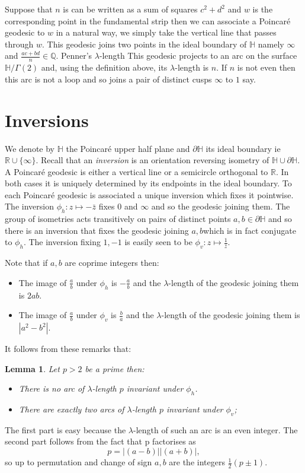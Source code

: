 \documentclass[12pt,a4paper]{amsart}
\newtheorem{lem}[thm]{Lemma}
\def\rh{\phi_h}
\def\rv{\phi_v}
\def\HH{\mathbb{H}}
\def\dHH{\partial \mathbb{H}}
\def\g2{\Gamma(2)}
\def\xx{\HH/\g2}
\begin{document}
Suppose that $n$ is can be written as a sum of squares $c^2 +d^2$
and $w$ is the corresponding point in the fundamental strip then we
can associate a Poincaré geodesic to $w$ in a natural way, 
we simply take the vertical line that passes through $w$.
This geodesic joins two points in the ideal boundary of $\mathbb{H}$
namely $\infty$ and $\frac{ac + bd}{n}\in \mathbb{Q}$.
Penner's $\lambda$-length
This geodesic projects to an arc on the surface $\xx$
and, using the definition above, its $\lambda$-length is $n$.
If $n$ is not even then this arc is not a loop
and so joins a pair of distinct cusps $\infty$ to $1$ say.



\section{Inversions}

We denote by $\mathbb{H}$ the Poincaré upper half plane and $\dHH$
its ideal boundary ie $\mathbb{R}\cup \{\infty\}$.
Recall that an \textit{inversion} is an orientation reversing
isometry of $\mathbb{H}\cup \dHH$. 
A Poincaré geodesic is either a vertical line or a semicircle
orthogonal to $\mathbb{R}$.
In both cases it is uniquely determined by its endpoints in the
ideal boundary.
To each Poincaré geodesic is associated a unique inversion which fixes it pointwise. 
The inversion
$\rh: z\mapsto -\bar{z}$ fixes $0$ and $\infty$ 
and so the geodesic joining them.
The group of isometries acts transitively on pairs of distinct
points $a,b \in \partial \mathbb{H}$ and so
there is an inversion that fixes the geodesic joining $a,b$which is
in fact conjugate to $\rh$.
The inversion fixing $1,-1$ is easily seen to be
$\rv:z\mapsto \frac{1}{\bar{z}}$. 

Note that if $a,b$ are coprime integers then:
\begin{itemize}
	\item
The image of $\frac{a}{b}$ under $\rh$ is $-\frac{a}{b}$
and the $\lambda$-length of the geodesic joining them is $2ab$.

	\item
The image of $\frac{a}{b}$ under $\rv$ is $\frac{b}{a}$
and the $\lambda$-length of the geodesic joining them 
is $|a^2 - b^2|$.

\end{itemize}
It follows from these remarks that:
\begin{lem}
	Let $p>2$ be a prime then:
	
\begin{itemize} 

	\item There is no arc of $\lambda$-length $p$
		invariant under $\rh$.
	\item There are exactly two arcs of $\lambda$-length
		$p$ invariant under $\rv$;

\end{itemize}
\end{lem}
\proof 
The first part is easy because the $\lambda$-length of such an arc
is an even integer.
The second part follows from the fact that p factorises as
$$p = |(a-b)| |(a+b)|,$$
so up to permutation and change of sign $a,b$ are the integers
$\frac{1}{2}(p\pm1)$.
\end{document}
